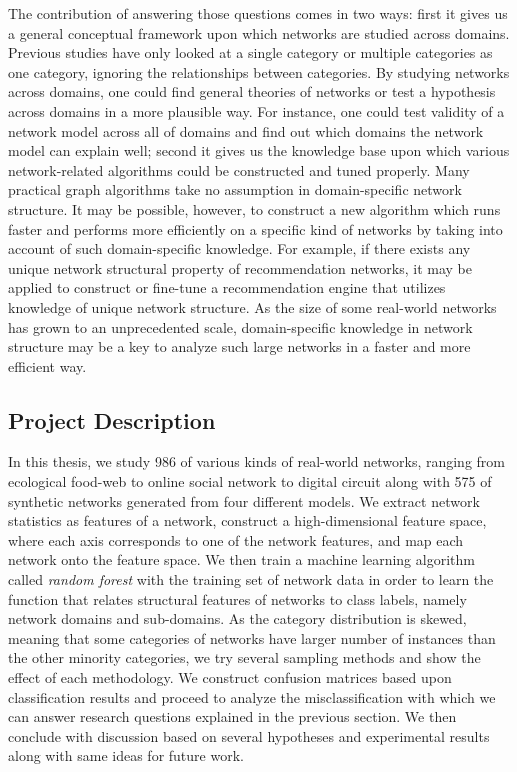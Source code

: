 \documentclass{article}
\begin{document}
The contribution of answering those questions comes in two ways: first it gives us a general conceptual framework upon which networks are studied across domains. Previous studies have only looked at a single category or multiple categories as one category, ignoring the relationships between categories. By studying networks across domains, one could find general theories of networks or test a hypothesis across domains in a more plausible way.  For instance, one could test validity of a network model across all of domains and find out which domains the network model can explain well; second it gives us the knowledge base upon which various network-related algorithms could be constructed and tuned properly.  Many practical graph algorithms take no assumption in domain-specific network structure. It may be possible, however, to construct a new algorithm which runs faster and performs more efficiently on a specific kind of networks by taking into account of such domain-specific knowledge. For example, if there exists any unique network structural property of recommendation networks,  it may be applied to construct or fine-tune a recommendation engine that utilizes knowledge of unique network structure. As the size of some real-world networks has grown to an unprecedented scale, domain-specific knowledge in network structure may be a key to analyze such large networks in a faster and more efficient way.

\subsection{Project Description}

In this thesis, we study 986 of various kinds of real-world networks, ranging from ecological food-web to online social network to digital circuit along with 575 of synthetic networks generated from four different models. We extract network statistics as features of a network, construct a high-dimensional feature space, where each axis corresponds to one of the network features, and map each network onto the feature space. We then train a machine learning algorithm called \textit{random forest} with the training set of network data in order to learn the function that relates structural features of networks to class labels, namely network domains and sub-domains. As the category distribution is skewed, meaning that some categories of networks have larger number of instances than the other minority categories, we try several sampling methods and show the effect of each methodology. We construct confusion matrices based upon classification results and proceed to analyze the misclassification with which we can answer research questions explained in the previous section. We then conclude with discussion based on several hypotheses and experimental results along with same ideas for future work.
\end{document}
